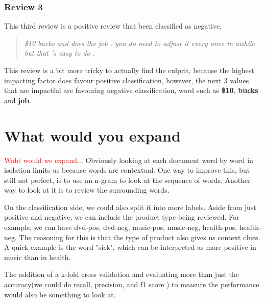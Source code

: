 \documentclass[runningheads]{llncs}
\begin{document}
    \subsubsection{Review 3}
    This third review is a positive review that been classified as negative.
    \begin{quotation}
        \textit{\$10 bucks and does the job . you do need to adjust it every once in awhile but that 's easy to do .}
    \end{quotation}
    This review is a bit more tricky to actually find the culprit, because the highest impacting factor does favour positive classification, however, the next 3 values that are impactful are favouring negative classification, word such as \textbf{\$10}, \textbf{bucks} and \textbf{job}.
    
    \section{What would you expand}
    \textcolor{red}{Waht would we expand...}
    Obviously looking at each document word by word in isolation limits us because words are contextual. One way to improve this, but still not perfect, is to use an n-gram to look at the sequence of words. Another way to look at it is to review the surrounding words.

    On the classification side, we could also split it into more labels. Aside from just positive and negative, we can include the product type being reviewed. For example, we can have dvd-pos, dvd-neg, music-pos, music-neg, health-pos, health-neg. The reasoning for this is that the type of product also gives us context clues. A quick example is the word "sick", which can be interpreted as more positive in music than in health.

    The addition of a k-fold cross validation and evaluating more than just the accuracy(we could do recall, precision, and f1 score ) to measure the performance would also be something to look at.

    
    
    
\end{document}
